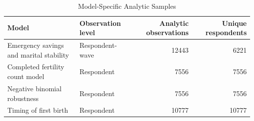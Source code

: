 \begin{table}

\caption{Model-Specific Analytic Samples}
\centering
\begin{tabular}[t]{llrr}
\toprule
Model & Observation level & Analytic observations & Unique respondents\\
\midrule
Emergency savings and marital stability & Respondent-wave & 12443 & 6221\\
Completed fertility count model & Respondent & 7556 & 7556\\
Negative binomial robustness & Respondent & 7556 & 7556\\
Timing of first birth & Respondent & 10777 & 10777\\
\bottomrule
\end{tabular}
\end{table}
